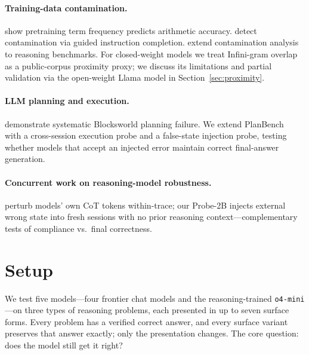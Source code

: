 \documentclass{article}
\newcommand{\omini}{\texttt{o4-mini}}     %
\begin{document}
\paragraph{Training-data contamination.}
\citet{razeghi2022impact} show pretraining term frequency predicts
arithmetic accuracy. \citet{golchin2023time} detect contamination via guided
instruction completion. \citet{shi2024detecting} extend contamination
analysis to reasoning benchmarks. For closed-weight models we treat
Infini-gram overlap~\citep{liu2024infini} as a public-corpus proximity
proxy; we discuss its limitations and partial validation via the
open-weight Llama model in Section~\ref{sec:proximity}.

\paragraph{LLM planning and execution.}
\citet{valmeekam2023planning} demonstrate systematic Blocksworld planning
failure. We extend PlanBench~\citep{valmeekam2023planbench} with a
cross-session execution probe and a false-state injection probe, testing
whether models that accept an injected error maintain correct final-answer
generation.

\paragraph{Concurrent work on reasoning-model robustness.}
\citet{vonrecum2026reasoning} perturb models' own CoT tokens within-trace;
our Probe-2B injects external wrong state into fresh sessions with no prior
reasoning context---complementary tests of compliance vs.\ final
correctness.



\section{Setup}
\label{sec:setup}

We test five models---four frontier chat models and the reasoning-trained
\omini---on three types of reasoning problems, each presented in up to seven
surface forms. Every problem has a verified correct answer, and every surface
variant preserves that answer exactly; only the presentation changes. The
core question: does the model still get it right?
\end{document}
